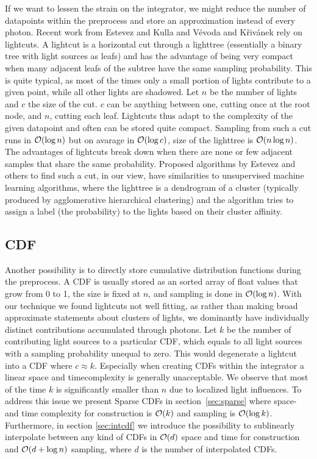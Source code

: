 If we want to lessen the strain on the integrator, we might reduce the number of datapoints within the preprocess and store an approximation instead of every photon. Recent work from Estevez and Kulla \cite{Estevez} and Vévoda and Křivánek \cite{Vevoda} rely on lightcuts. A lightcut is a horizontal cut through a lighttree (essentially a binary tree with light sources as leafs) and has the advantage of being very compact when many adjacent leafs of the subtree have the same sampling probability. This is quite typical, as most of the times only a small portion of lights contribute to a given point, while all other lights are shadowed. Let $n$ be the number of lights and $c$ the size of the cut. $c$ can be anything between one, cutting once at the root node, and $n$, cutting each leaf. Lightcuts thus adapt to the complexity of the given datapoint and often can be stored quite compact. Sampling from such a cut runs in $\mathcal{O}(\log{n})$ but on avarage in $\mathcal{O}(\log{c})$, size of the lighttree is $\mathcal{O}(n\log{n})$. The advantages of lightcuts break down when there are none or few adjacent samples that share the same probability. Proposed algorithms by Estevez \cite{Estevez} and others to find such a cut, in our view, have similarities to unsupervised machine learning algorithms, where the lighttree is a dendrogram of a cluster (typically produced by agglomerative hierarchical clustering) and the algorithm tries to assign a label (the probability) to the lights based on their cluster affinity. 

\subsection{CDF}

Another possibility is to directly store cumulative distribution functions during the preprocess. A CDF is usually stored as an sorted array of float values that grow from 0 to 1, the size is fixed at $n$, and sampling is done in $\mathcal{O}(\log{n})$. With our technique we found lightcuts not well fitting, as rather than making broad approximate statements about clusters of lights, we dominantly have individually distinct contributions accumulated through photons. Let $k$ be the number of contributing light sources to a particular CDF, which equals to all light sources with a sampling probability unequal to zero. This would degenerate a lightcut into a CDF where $c \approx k$. Especially when creating CDFs within the integrator a linear space and timecomplexity is generally unacceptable. We observe that most of the time $k$ is significantly smaller than $n$ due to localized light influences. To address this issue we present Sparse CDFs in section~\ref{sec:sparse} where space- and time complexity for construction is $\mathcal{O}(k)$ and sampling is $\mathcal{O}(\log{k})$. Furthermore, in section \ref{sec:intcdf} we introduce the possibility to sublinearly interpolate between any kind of CDFs in $\mathcal{O}(d)$ space and time for construction and $\mathcal{O}(d + \log{n})$ sampling, where $d$ is the number of interpolated CDFs.

